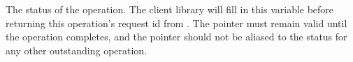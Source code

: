 The status of the operation.  The client library will fill in this variable
before returning this operation's request id from .
The pointer must remain valid until the operation completes, and the pointer
should not be aliased to the status for any other outstanding operation.
